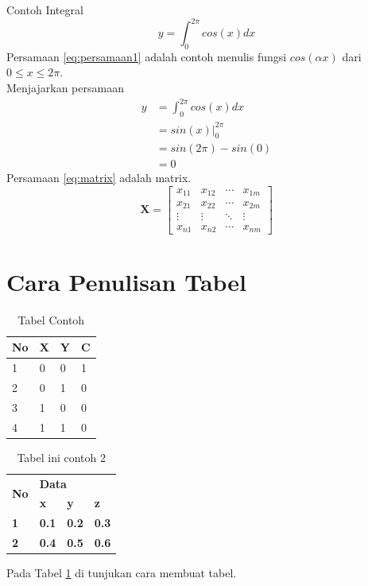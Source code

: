 Contoh Integral
\begin{equation}\label{eq:persamaan1}
y=\int_{0}^{2\pi} cos(x) dx
\end{equation}
Persamaan \ref{eq:persamaan1} adalah contoh menulis fungsi $cos(\alpha x)$ dari $0\le x\le 2\pi$.\\
Menjajarkan persamaan
\begin{align}
y&=\int_{0}^{2\pi}cos(x)dx\\
&=sin(x)|_0^{2\pi}\\
&=sin(2\pi)-sin(0)\\
&=0
\end{align}
Persamaan \ref{eq:matrix} adalah matrix.
\begin{equation}\label{eq:matrix}
\textbf{X}=\begin{bmatrix}
x_{11}&x_{12}&\cdots&x_{1m}\\
x_{21}&x_{22}&\cdots&x_{2m}\\
\vdots&\vdots&\ddots&\vdots\\
x_{n1}&x_{n2}&\cdots&x_{nm}
\end{bmatrix}
\end{equation}
\vspace{1ex}
\section{Cara Penulisan Tabel}
\begin{table}[H]
	\caption{Tabel Contoh}
	\begin{tabular}{|l|l|l|l|}
		\hline
		No & X & Y & C \\ \hline
		1 & 0 & 0 & 1 \\ \hline
		2 & 0 & 1 & 0 \\ \hline
		3 & 1 & 0 & 0 \\ \hline
		4 & 1 & 1 & 0 \\ \hline
	\end{tabular}
\end{table}


\begin{table}[H]
	\label{tab:tabelcontoh2}
	\caption{Tabel ini contoh 2}
	\begin{tabular}{|l|l|l|l|}
		\hline
		\multirow{2}{*}{\textbf{No}} & \multicolumn{3}{l|}{\textbf{Data}} \\ \cline{2-4} 
		& \textbf{x} & \textbf{y} & \textbf{z} \\ \hline
		\textbf{1} & \textbf{0.1} & \textbf{0.2} & \textbf{0.3} \\ \hline
		\textbf{2} & \textbf{0.4} & \textbf{0.5} & \textbf{0.6} \\ \hline
	\end{tabular}
\end{table}
Pada Tabel \ref{tab:tabelcontoh2} di tunjukan cara membuat tabel.


